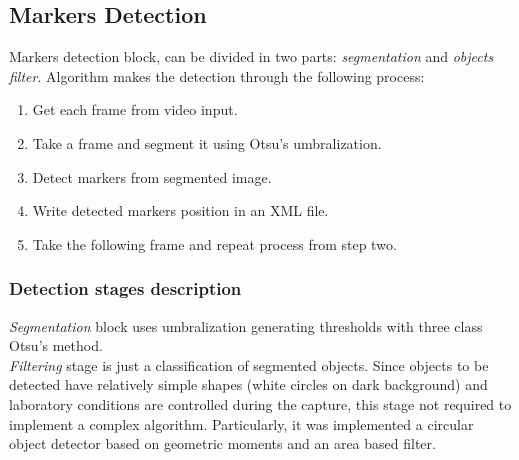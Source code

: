 \subsection{Markers Detection}
Markers detection block, can be divided in two parts: \textit{segmentation} and \textit{objects filter}.
%
Algorithm makes the detection through the following process:
%
\begin{enumerate}
  \item Get each frame from video input.
  \item Take a frame and segment it using Otsu's umbralization.
  \item Detect markers from segmented image.
  \item Write detected markers position in an XML file.
  \item Take the following frame and repeat process from step two.
\end{enumerate}
%
\subsubsection{Detection stages description}
\textit{Segmentation} block uses umbralization generating thresholds with three class Otsu's method\cite{otsu}.\\
%
\textit{Filtering} stage is just a classification of segmented objects. Since objects to be detected have relatively simple shapes (white circles on dark background) and laboratory conditions are controlled during the capture, this stage not required to implement a complex algorithm. Particularly, it was implemented a circular object detector based on geometric moments\cite{imageMoments} and an area based filter.
%
